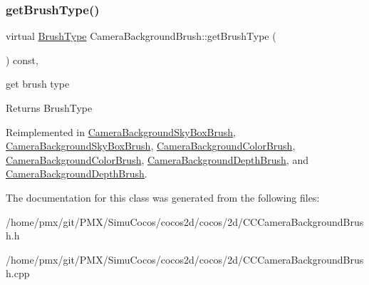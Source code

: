 \mbox{\label{classCameraBackgroundBrush_a72447fd86e40e0d7e263b906c2f9af12}} 
\subsubsection{\texorpdfstring{get\+Brush\+Type()}{getBrushType()}\hspace{0.1cm}{\footnotesize\ttfamily [2/2]}}
{\footnotesize\ttfamily virtual \hyperlink{classCameraBackgroundBrush_acb83e8d05e7ab9386c041d22c444760f}{Brush\+Type} Camera\+Background\+Brush\+::get\+Brush\+Type (\begin{DoxyParamCaption}{ }\end{DoxyParamCaption}) const\hspace{0.3cm}{\ttfamily [inline]}, {\ttfamily [virtual]}}

get brush type \begin{DoxyReturn}{Returns}
Brush\+Type 
\end{DoxyReturn}


Reimplemented in \hyperlink{classCameraBackgroundSkyBoxBrush_a2db3e09fced9ed84fb3e5df9f24bba8e}{Camera\+Background\+Sky\+Box\+Brush}, \hyperlink{classCameraBackgroundSkyBoxBrush_a2db3e09fced9ed84fb3e5df9f24bba8e}{Camera\+Background\+Sky\+Box\+Brush}, \hyperlink{classCameraBackgroundColorBrush_a96ecf77baa742b668db0d22c350b8f1b}{Camera\+Background\+Color\+Brush}, \hyperlink{classCameraBackgroundColorBrush_a96ecf77baa742b668db0d22c350b8f1b}{Camera\+Background\+Color\+Brush}, \hyperlink{classCameraBackgroundDepthBrush_ad4cc258ce1a1cd3ac43ea0d2580409d5}{Camera\+Background\+Depth\+Brush}, and \hyperlink{classCameraBackgroundDepthBrush_ad4cc258ce1a1cd3ac43ea0d2580409d5}{Camera\+Background\+Depth\+Brush}.



The documentation for this class was generated from the following files\+:\begin{DoxyCompactItemize}
\item 
/home/pmx/git/\+P\+M\+X/\+Simu\+Cocos/cocos2d/cocos/2d/C\+C\+Camera\+Background\+Brush.\+h\item 
/home/pmx/git/\+P\+M\+X/\+Simu\+Cocos/cocos2d/cocos/2d/C\+C\+Camera\+Background\+Brush.\+cpp\end{DoxyCompactItemize}
